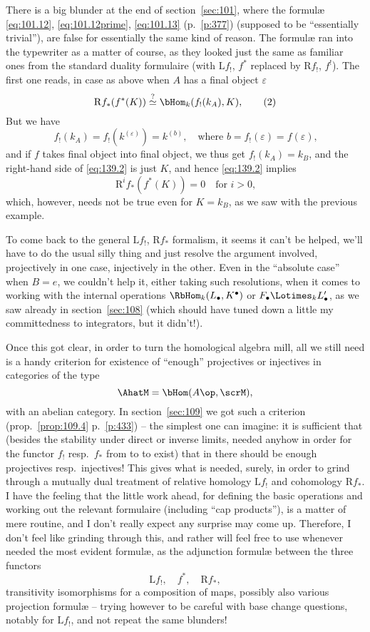 There is a big blunder at the end of section~\ref{sec:101}, where the
formulæ \eqref{eq:101.12}, \eqref{eq:101.12prime}, \eqref{eq:101.13}
(p.~\ref{p:377}) (supposed to be ``essentially trivial''), are false
for essentially the same kind of reason. The formulæ ran into the
typewriter as a matter of course, as they looked just the
same as familiar ones from the standard duality formulaire (with
$\mathrm Lf_!$, $f^*$ replaced by $\mathrm Rf_!$, $f^!$). The first
one reads, in case as above when $A$ has a final object $\varepsilon$
\begin{equation}
  \label{eq:139.2}
  \mathrm Rf_*(f^*(K)) \overset{\text{?}}{\simeq}
  \bHom_k(f_!(k_A),K),\tag{2}
\end{equation}
But we have 
\[f_!(k_A)=f_!(k^{(\varepsilon)}) = k^{(b)} , \quad
  \text{where $b=f_!(\varepsilon)=f(\varepsilon)$,}\]
and if $f$ takes final object into final object, we thus get
$f_!(k_A)=k_B$, and the right-hand side of \eqref{eq:139.2} is just
$K$, and hence \eqref{eq:139.2} implies
\[\mathrm R^if_*(f^*(K)) = 0 \quad \text{for $i>0$,}\]
which, however, needs not be true even for $K=k_B$, as we saw with the
previous example.

To come back to the general $\mathrm Lf_!$, $\mathrm Rf_*$ formalism,
it seems it can't be helped, we'll have to do the usual silly thing
and just resolve the argument involved, projectively in one case,
injectively in the other. Even in the ``absolute case'' when $B=e$, we
couldn't help it, either taking such resolutions, when it comes to
working with the internal operations $\RbHom_k(L_\bullet,K^\bullet)$
or $F_\bullet\Lotimes_k L_\bullet'$, as we saw already in
section~\ref{sec:108} (which should have tuned down a little my
committedness to integrators, but it didn't!).

Once this got clear, in order to turn the homological algebra mill,
all we still need is a handy criterion for existence of ``enough''
projectives or injectives in categories of the type
\[ \AhatM = \bHom(A\op, \scrM),\]
with \scrM{} an abelian category. In section~\ref{sec:109} we got such
a criterion (prop.~\ref{prop:109.4} p.~\ref{p:433}) -- the simplest
one can imagine: it is sufficient that (besides the stability under
direct or inverse limits, needed anyhow in order for the functor $f_!$
resp.\ $f_*$ from \AhatM{} to \BhatM{} to exist) that in
\scrM{} there should be enough projectives resp.\ injectives! This
gives what is needed, surely, in order to grind through a mutually
dual treatment of relative homology $\mathrm Lf_!$ and cohomology
$\mathrm Rf_*$. I have the feeling that the little work ahead, for
defining the basic operations and working out the relevant formulaire
(including ``cap products''), is a matter of mere routine, and I don't
really expect any surprise may come up. Therefore, I don't feel like
grinding through this, and rather will feel free to use whenever
needed the most evident formulæ, as the adjunction formulæ between the
three functors
\[ \mathrm Lf_!, \quad f^*, \quad \mathrm Rf_*,\]
transitivity isomorphisms for a composition of maps, possibly also
various projection formulæ -- trying however to be careful with base
change questions, notably for $\mathrm Lf_!$, and not repeat the same
blunders!

